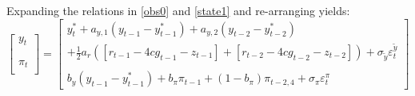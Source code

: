 \documentclass[a4paper,12pt]{article}
\begin{document}
\pagebreak

Expanding the relations in \ref{obs0} and \ref{state1} and re-arranging
yields:%
\begin{equation}
\begin{bmatrix}
y_{t} \\
\\
\\
\pi _{t} \\
\end{bmatrix}%
=%
\begin{bmatrix}
y_{t}^{\ast }+a_{y,1}\left( y_{t-1}-y_{t-1}^{\ast }\right) +a_{y,2}\left(
y_{t-2}-y_{t-2}^{\ast }\right)  \\
+\frac{1}{2}a_{r}\left( \left[ r_{t-1}-4cg_{t-1}-z_{t-1}\right] +\left[
r_{t-2}-4cg_{t-2}-z_{t-2}\right] \right) +\sigma _{\tilde{y}}\varepsilon
_{t}^{\tilde{y}} \\
\\
b_{y}\left( y_{t-1}-y_{t-1}^{\ast }\right) +b_{\pi }\pi _{t-1}+(1-b_{\pi
})\pi _{t-2,4}+\sigma _{\pi }\varepsilon _{t}^{\pi }%
\end{bmatrix}
\label{lwa}
\end{equation}
\end{document}
